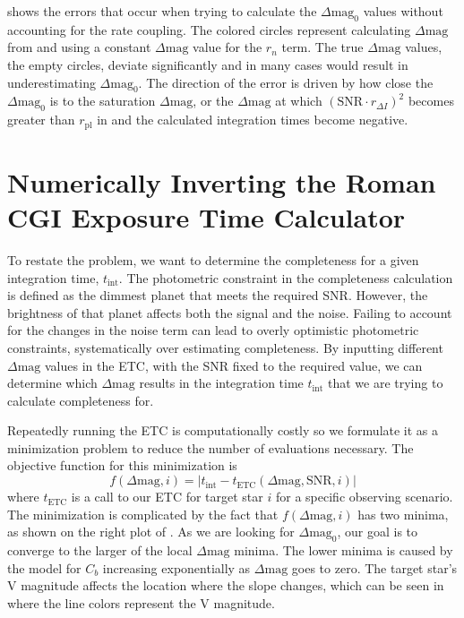  shows the errors that occur when trying to
calculate the $\Delta\textrm{mag}_0$ values without accounting for the rate
coupling. The colored circles represent calculating $\Delta\textrm{mag}$
from  and using a constant
$\Delta\textrm{mag}$ value for the $r_n$ term. The true $\Delta\textrm{mag}$
values, the empty circles, deviate significantly and in many cases would result
in underestimating $\Delta\textrm{mag}_0$. The direction of the error is driven
by how close the $\Delta\textrm{mag}_0$ is to the saturation
$\Delta\textrm{mag}$, or the $\Delta\textrm{mag}$ at which $\left(\textrm{SNR}
\cdot r_{\Delta I}\right)^2$ becomes greater than $r_{\textrm{pl}}$ in
 and the calculated integration times become
negative.



\section{Numerically Inverting the Roman CGI Exposure Time Calculator}
\label{sec:numerically_inverting_ETC}

To restate the problem, we want to determine the completeness for a given
integration time, $t_{\textrm{int}}$. The photometric constraint in the
completeness calculation is defined as the dimmest planet that meets the
required SNR. However, the brightness of that planet affects both the signal
and the noise. Failing to account for the changes in the noise term can lead to
overly optimistic photometric constraints, systematically over estimating
completeness. By inputting different $\Delta\textrm{mag}$ values in the
ETC, with the SNR fixed to the required value, we can
determine which $\Delta\textrm{mag}$ results in the integration time
$t_{\textrm{int}}$ that we are trying to calculate completeness for.

Repeatedly running the ETC is computationally costly so we formulate it as a
minimization problem to reduce the number of evaluations necessary. The
objective function for this minimization is
\begin{equation}
  f(\Delta\textrm{mag}, i) = |t_{\textrm{int}} -
  t_{\textrm{ETC}}(\Delta\textrm{mag}, \textrm{SNR}, i)|
  \label{eq:intTime_root_obj}
\end{equation}
where $t_{\textrm{ETC}}$ is a call to our ETC for target star $i$ for a
specific observing scenario. The minimization is complicated by the fact that
$f\left(\Delta\textrm{mag}, i\right)$ has two minima, as shown on the right plot of
. As we are looking for
$\Delta\textrm{mag}_0$, our goal is to converge to the larger of the local
$\Delta\textrm{mag}$ minima. The lower minima is caused by the model for $C_b$
increasing exponentially as $\Delta\textrm{mag}$ goes to zero. The target
star's V magnitude affects the location where the slope changes, which can be seen in  where the line colors represent
the V magnitude.

